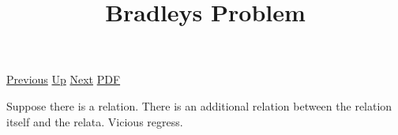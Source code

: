 \documentclass[12pt,a4paper]{report}
\begin{document}
 \href{doc/phil/PhilProblems/AgrippanTrilemma.html}{Previous} 
 \href{doc/phil/PhilProblems.html}{Up} 
 \href{doc/phil/PhilProblems/Universals.html}{Next} 
 \href{doc/phil/PhilProblems/BradleysProblem.pdf}{PDF} 
\title{Bradleys Problem}
Suppose there is a relation. There is an additional relation between the relation itself and the relata. Vicious regress.
\end{document}
